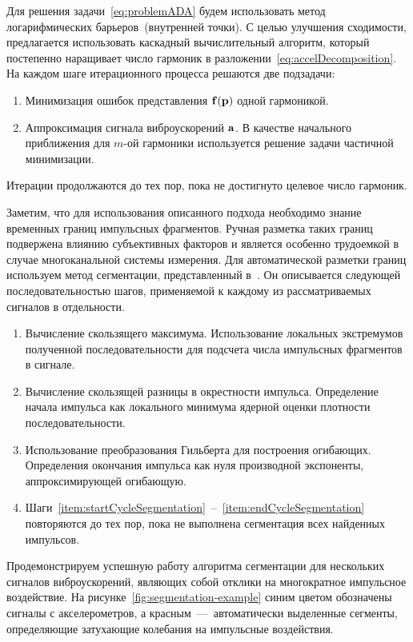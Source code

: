 Для решения задачи~\eqref{eq:problemADA} будем использовать метод логарифмических барьеров~(внутренней точки). С целью улучшения сходимости, предлагается использовать каскадный вычислительный алгоритм, который постепенно наращивает число гармоник в разложении~\eqref{eq:accelDecomposition}. На каждом шаге итерационного процесса решаются две подзадачи:
\begin{enumerate}
	\item Минимизация ошибок представления $ \mathbf{f(\mathbf{p})} $ одной гармоникой. 
	\item Аппроксимация сигнала виброускорений $ \mathbf{a} $. В качестве начального приближения для $ m $-ой гармоники используется решение задачи частичной минимизации. 
\end{enumerate}

Итерации продолжаются до тех пор, пока не достигнуто целевое число гармоник. 

Заметим, что для использования описанного подхода необходимо знание временных границ импульсных фрагментов. Ручная разметка таких границ подвержена влиянию субъективных факторов и является особенно трудоемкой в случае многоканальной системы измерения. Для автоматической разметки границ используем метод сегментации, представленный в~\cite{lib:oma:Gasior}. Он описывается следующей последовательностью шагов, применяемой к каждому из рассматриваемых сигналов в отдельности.
\begin{enumerate}
	\item Вычисление скользящего максимума. Использование локальных экстремумов полученной последовательности для подсчета числа импульсных фрагментов в сигнале.
	\item Вычисление скользящей разницы в окрестности импульса. Определение начала импульса как локального минимума ядерной оценки плотности последовательности. \label{item:startCycleSegmentation}
	\item Использование преобразования Гильберта для построения огибающих. Определения окончания импульса как нуля производной экспоненты, аппроксимирующей огибающую. \label{item:endCycleSegmentation}
	\item Шаги~\ref{item:startCycleSegmentation}~--~\ref{item:endCycleSegmentation} повторяются до тех пор, пока не выполнена сегментация всех найденных импульсов. 
\end{enumerate}

Продемонстрируем успешную работу алгоритма сегментации для нескольких сигналов виброускорений, являющих собой отклики на многократное импульсное воздействие. На рисунке~\ref{fig:segmentation-example} синим цветом обозначены сигналы с акселерометров, а красным~---~автоматически выделенные сегменты, определяющие затухающие колебания на импульсные воздействия. 

